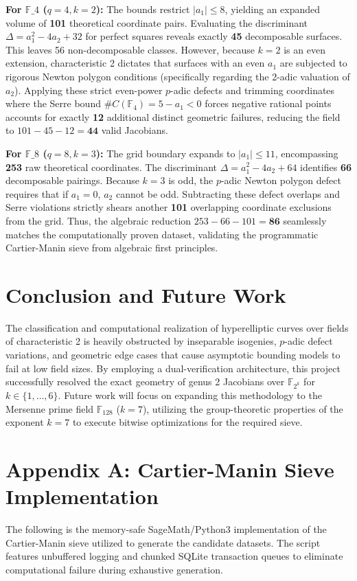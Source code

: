 \documentclass[12pt]{article}
\begin{document}
\textbf{For $\mathbb{F}\_4$ ($q=4, k=2$):}
The bounds restrict $\vert{}a_1\vert{} \le 8$, yielding an expanded volume of \textbf{101} theoretical coordinate pairs. 
Evaluating the discriminant $\Delta = a_1^2 - 4a_2 + 32$ for perfect squares reveals exactly \textbf{45} decomposable surfaces. This leaves 56 non-decomposable classes. However, because $k=2$ is an even extension, characteristic 2 dictates that surfaces with an even $a_1$ are subjected to rigorous Newton polygon conditions (specifically regarding the 2-adic valuation of $a_2$). Applying these strict even-power $p$-adic defects and trimming coordinates where the Serre bound $\#C(\mathbb{F}_4) = 5 - a_1 < 0$ forces negative rational points accounts for exactly \textbf{12} additional distinct geometric failures, reducing the field to $101 - 45 - 12 = \textbf{44}$ valid Jacobians.

\textbf{For $\mathbb{F}\_8$ ($q=8, k=3$):}
The grid boundary expands to $\vert{}a_1\vert{} \le 11$, encompassing \textbf{253} raw theoretical coordinates. 
The discriminant $\Delta = a_1^2 - 4a_2 + 64$ identifies \textbf{66} decomposable pairings. Because $k=3$ is odd, the $p$-adic Newton polygon defect requires that if $a_1 = 0$, $a_2$ cannot be odd. Subtracting these defect overlaps and Serre violations strictly shears another \textbf{101} overlapping coordinate exclusions from the grid. Thus, the algebraic reduction $253 - 66 - 101 = \textbf{86}$ seamlessly matches the computationally proven dataset, validating the programmatic Cartier-Manin sieve from algebraic first principles.

\section{Conclusion and Future Work}
The classification and computational realization of hyperelliptic curves over fields of characteristic 2 is heavily obstructed by inseparable isogenies, $p$-adic defect variations, and geometric edge cases that cause asymptotic bounding models to fail at low field sizes. By employing a dual-verification architecture, this project successfully resolved the exact geometry of genus 2 Jacobians over $\mathbb{F}_{2^k}$ for $k \in \{1, \dots, 6\}$. Future work will focus on expanding this methodology to the Mersenne prime field $\mathbb{F}_{128}$ ($k=7$), utilizing the group-theoretic properties of the exponent $k=7$ to execute bitwise optimizations for the required sieve.

\section*{Appendix A: Cartier-Manin Sieve Implementation}
The following is the memory-safe SageMath/Python3 implementation of the Cartier-Manin sieve utilized to generate the candidate datasets. The script features unbuffered logging and chunked SQLite transaction queues to eliminate computational failure during exhaustive generation.
\end{document}
